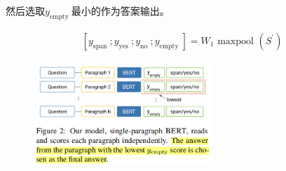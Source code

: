 \documentclass[a4paper,UTF8]{article}
\numberwithin{equation}{section}
\begin{document}
	然后选取$y_{\text {empty }}$最小的作为答案输出。

	\begin{align}
		\left[y_{\text {span }} ; y_{\text {yes }} ; y_{\text {no }} ; y_{\text {empty }}\right]=W_{1} \text { maxpool }\left(S^{\prime}\right)
		\end{align}
		\begin{figure}[H]
			\centering
			\includegraphics[width=0.6\textwidth]{4-1.png}
		\end{figure}
\end{document}

